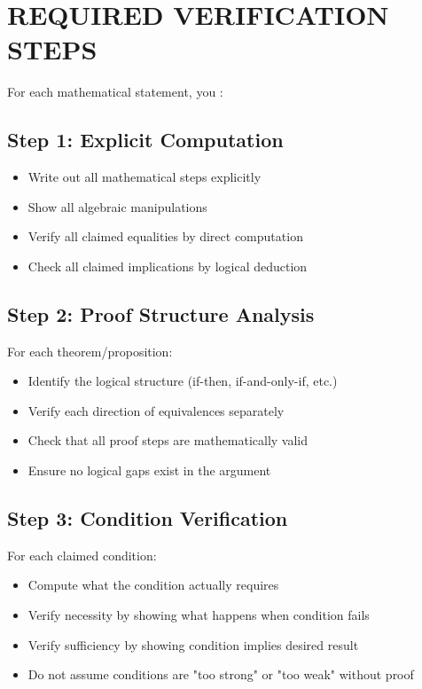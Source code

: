 \documentclass{article}
\newcommand{\tmtextbf}[1]{\text{{\bfseries{#1}}}}
\begin{document}
\section{REQUIRED VERIFICATION STEPS}

For each mathematical statement, you \tmtextbf{MUST}:

\subsection{Step 1: Explicit Computation}

\begin{itemize}
  \item Write out all mathematical steps explicitly
  
  \item Show all algebraic manipulations
  
  \item Verify all claimed equalities by direct computation
  
  \item Check all claimed implications by logical deduction
\end{itemize}

\subsection{Step 2: Proof Structure Analysis}

For each theorem/proposition:
\begin{itemize}
  \item Identify the logical structure (if-then, if-and-only-if, etc.)
  
  \item Verify each direction of equivalences separately
  
  \item Check that all proof steps are mathematically valid
  
  \item Ensure no logical gaps exist in the argument
\end{itemize}

\subsection{Step 3: Condition Verification}

For each claimed condition:
\begin{itemize}
  \item Compute what the condition actually requires
  
  \item Verify necessity by showing what happens when condition fails
  
  \item Verify sufficiency by showing condition implies desired result
  
  \item Do not assume conditions are "too strong" or "too weak" without proof
\end{itemize}
\end{document}
